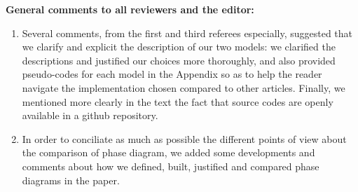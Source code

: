 \documentclass[11pt,a4paper,sans]{moderncv}        %
\begin{document}
\bigskip
\bigskip



\textbf{General comments to all reviewers and the editor: }

\bigskip

\begin{enumerate}
	\item Several comments, from the first and third referees especially, suggested that we clarify and explicit the description of our two models: we clarified the descriptions and justified our choices more thoroughly, and also provided pseudo-codes for each model in the Appendix so as to help the reader navigate the implementation chosen compared to other articles. Finally, we mentioned more clearly in the text the fact that source codes are openly available in a github repository.
    \item In order to conciliate as much as possible the different points of view about the comparison of phase diagram, we added some developments and comments about how we defined, built, justified and compared phase diagrams in the paper.
    \end{enumerate}



\justify




\end{document}
